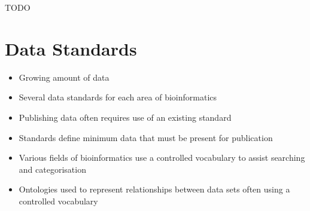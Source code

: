 \documentclass[a4paper]{article}
\begin{document}
TODO

\section{Data Standards}

\begin{itemize}
  \item
    Growing amount of data

  \item
    Several data standards for each area of bioinformatics

  \item
    Publishing data often requires use of an existing standard

  \item
    Standards define minimum data that must be present for publication

  \item
    Various fields of bioinformatics use a controlled vocabulary to assist
    searching and categorisation

  \item
    Ontologies used to represent relationships between data sets often using a
    controlled vocabulary
\end{itemize}
\end{document}
